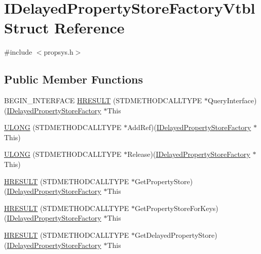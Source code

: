 \hypertarget{struct_i_delayed_property_store_factory_vtbl}{}\section{I\+Delayed\+Property\+Store\+Factory\+Vtbl Struct Reference}
\label{struct_i_delayed_property_store_factory_vtbl}


{\ttfamily \#include $<$propsys.\+h$>$}

\subsection*{Public Member Functions}
\begin{DoxyCompactItemize}
\item 
B\+E\+G\+I\+N\+\_\+\+I\+N\+T\+E\+R\+F\+A\+CE \hyperlink{struct_i_delayed_property_store_factory_vtbl_a5fb9801434833f6f904906a80bb3db36}{H\+R\+E\+S\+U\+LT} (S\+T\+D\+M\+E\+T\+H\+O\+D\+C\+A\+L\+L\+T\+Y\+PE $\ast$Query\+Interface)(\hyperlink{propsys_8h_a88f1fe70fcf065032bd003b640da7f64}{I\+Delayed\+Property\+Store\+Factory} $\ast$This
\item 
\hyperlink{struct_i_delayed_property_store_factory_vtbl_a54091d46db4847bfc0422eb9d60879c1}{U\+L\+O\+NG} (S\+T\+D\+M\+E\+T\+H\+O\+D\+C\+A\+L\+L\+T\+Y\+PE $\ast$Add\+Ref)(\hyperlink{propsys_8h_a88f1fe70fcf065032bd003b640da7f64}{I\+Delayed\+Property\+Store\+Factory} $\ast$This)
\item 
\hyperlink{struct_i_delayed_property_store_factory_vtbl_a00a98b03cf8e802e4815fd848094c8ac}{U\+L\+O\+NG} (S\+T\+D\+M\+E\+T\+H\+O\+D\+C\+A\+L\+L\+T\+Y\+PE $\ast$Release)(\hyperlink{propsys_8h_a88f1fe70fcf065032bd003b640da7f64}{I\+Delayed\+Property\+Store\+Factory} $\ast$This)
\item 
\hyperlink{struct_i_delayed_property_store_factory_vtbl_aaf3f2c010e0e53f724609a9c25555caa}{H\+R\+E\+S\+U\+LT} (S\+T\+D\+M\+E\+T\+H\+O\+D\+C\+A\+L\+L\+T\+Y\+PE $\ast$Get\+Property\+Store)(\hyperlink{propsys_8h_a88f1fe70fcf065032bd003b640da7f64}{I\+Delayed\+Property\+Store\+Factory} $\ast$This
\item 
\hyperlink{struct_i_delayed_property_store_factory_vtbl_a62c97c3ad4e35488c00c670e07725082}{H\+R\+E\+S\+U\+LT} (S\+T\+D\+M\+E\+T\+H\+O\+D\+C\+A\+L\+L\+T\+Y\+PE $\ast$Get\+Property\+Store\+For\+Keys)(\hyperlink{propsys_8h_a88f1fe70fcf065032bd003b640da7f64}{I\+Delayed\+Property\+Store\+Factory} $\ast$This
\item 
\hyperlink{struct_i_delayed_property_store_factory_vtbl_a847bb90249566090bfb22398c7e8af12}{H\+R\+E\+S\+U\+LT} (S\+T\+D\+M\+E\+T\+H\+O\+D\+C\+A\+L\+L\+T\+Y\+PE $\ast$Get\+Delayed\+Property\+Store)(\hyperlink{propsys_8h_a88f1fe70fcf065032bd003b640da7f64}{I\+Delayed\+Property\+Store\+Factory} $\ast$This
\end{DoxyCompactItemize}
